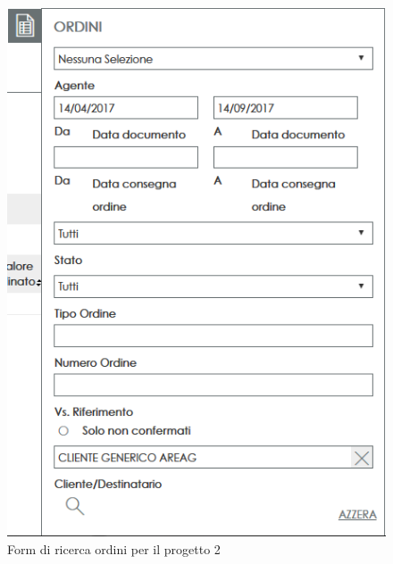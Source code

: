 \begin{figure}[H]
	\centering
	\includegraphics[height=0.8\linewidth]{Immagini/p2/params.png}
	\caption{Form di ricerca ordini per il progetto 2}
	\label{fig:params-2}
\end{figure}

